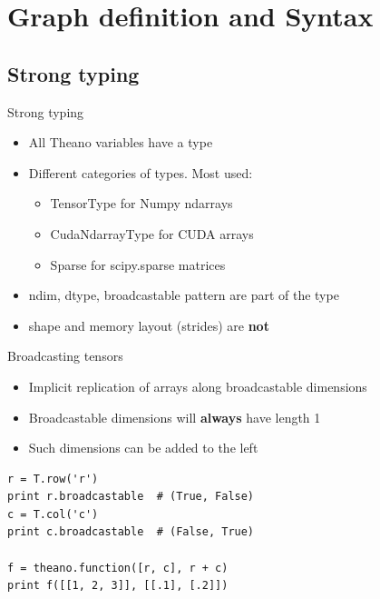 \documentclass[a4paper,9pt]{beamer}
\begin{document}
\section{Graph definition and Syntax}
\begin{frame}
  \tableofcontents[currentsection]
\end{frame}
\subsection{Strong typing}
\begin{frame}{Strong typing}
  \begin{itemize}
    \item All Theano variables have a type
    \item Different categories of types. Most used:
      \begin{itemize}
        \item TensorType for Numpy ndarrays
        \item CudaNdarrayType for CUDA arrays
        \item Sparse for scipy.sparse matrices
      \end{itemize}
    \item ndim, dtype, broadcastable pattern are part of the type
    \item shape and memory layout (strides) are {\bf not}
  \end{itemize}
\end{frame}

\begin{frame}[fragile]{Broadcasting tensors}
  \begin{itemize}
    \item Implicit replication of arrays along broadcastable dimensions
    \item Broadcastable dimensions will {\bf always} have length 1
    \item Such dimensions can be added to the left
  \end{itemize}
  \begin{verbatim}
r = T.row('r')
print r.broadcastable  # (True, False)
c = T.col('c')
print c.broadcastable  # (False, True)

f = theano.function([r, c], r + c)
print f([[1, 2, 3]], [[.1], [.2]])
  \end{verbatim}
\end{frame}
\end{document}
